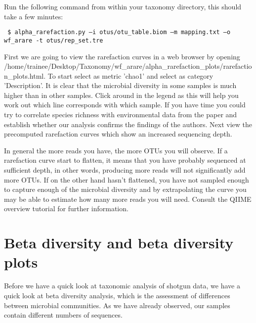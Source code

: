 \documentclass[a4paper,12pt,twoside]{memoir}
\begin{document}
\begin{steps}
 Run the following command from within your taxonomy directory, this should take a few minutes:
\begin{lstlisting}
 $ alpha_rarefaction.py –i otus/otu_table.biom –m mapping.txt –o wf_arare -t otus/rep_set.tre
\end{lstlisting}
 
 First we are going to view the rarefaction curves in a web browser by opening /home/trainee/Desktop/Taxonomy/wf\_arare/alpha\_rarefaction\_plots/rarefaction\_plots.html. 
 To start select as metric 'chao1' and select as category 'Description'. It is clear that the microbial diversity in some samples is much higher than in other samples. Click around in the legend as this will help you work out which line corresponds with which sample. If you have time you could try to correlate species richness with environmental data from the paper and establish whether our analysis confirms the findings of the authors.
 Next view the precomputed rarefaction curves which show an increased sequencing depth.
\end{steps}

\begin{information}
 In general the more reads you have, the more OTUs you will observe. If a rarefaction curve start to flatten, it means that you have probably sequenced at sufficient depth, in other words, producing more reads will not significantly add more OTUs. If on the other hand hasn't flattened, you have not sampled enough to capture enough of the microbial diversity and by extrapolating the curve you may be able to estimate how many more reads you will need. Consult the QIIME overview tutorial for further information.
\end{information}

\section{Beta diversity and beta diversity plots}

\begin{information}
 Before we have a quick look at taxonomic analysis of shotgun data, we have a quick look at beta diversity analysis, which is the assessment of differences between microbial communities. As we have already observed, our samples contain different numbers of sequences. 
\end{information}
\end{document}
